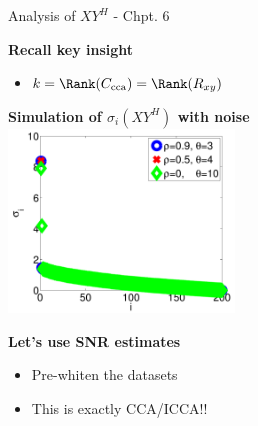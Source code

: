 \documentclass[8pt]{beamer}
\newcommand{\Rxy}{R_{xy}}
\newcommand{\Ccca}{C_{\text{cca}}}
\begin{document}
\begin{frame}{Analysis of $XY^H$ - Chpt. 6}

  \textbf{Recall key insight}
  \begin{itemize}
  \item $k = \Rank(\Ccca) = \Rank(\Rxy)$
  \end{itemize}

  \vspace{1ex}
  
  \begin{center}
    \textbf{Simulation of $\sigma_i(XY^H)$ with noise}\\
    \includegraphics[width=0.45\textwidth]{figures/xy_motiv_pres.pdf}
  \end{center}

  \vspace{1ex}

  \textbf{Let's use SNR estimates}
  \begin{itemize}
  \item Pre-whiten the datasets 
  \item This is exactly CCA/ICCA!!
  \end{itemize}

\end{frame}

\begin{frame}{Analysis of $XY^H$ - Chpt. 6}

  \textbf{Contributions


\end{frame}
\end{document}
